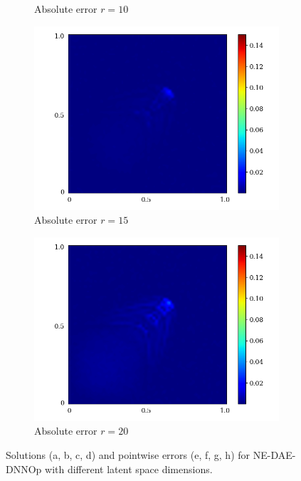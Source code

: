 \begin{figure}[!htb]
\begin{center}
\begin{subfigure}[b]{0.23\textwidth}
\begin{center}
            \end{center}
            \caption{Absolute error $r = 10$}
        \end{subfigure}   
        \begin{subfigure}[b]{0.23\textwidth}
            \begin{center}
            \includegraphics[trim = {0, 0, 3cm, 0}, clip, width=\textwidth]{Pictures/X-rom-NE-DAE-15-abs-err.png}
            \end{center}
            \caption{Absolute error $r = 15$}
        \end{subfigure}    
        \begin{subfigure}[b]{0.23\textwidth}
            \begin{center}
                \includegraphics[trim = {0, 0, 3cm, 0}, clip, width=\textwidth]{Pictures/X-rom-NE-DAE-20-abs-err.png}
            \end{center}
            \caption{Absolute error $r = 20$}
        \end{subfigure}
     \end{center}
     \caption[Solutions and pointwise errors for NE-DAE-DNNOp.]{Solutions (a, b, c, d) and pointwise errors (e, f, g, h) for NE-DAE-DNNOp with different latent space dimensions.}
        \label{fig: nedae-burger}
\end{figure}

